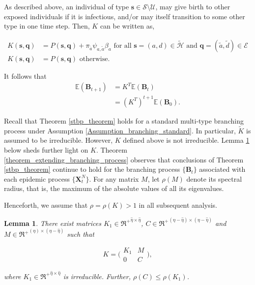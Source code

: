 \documentclass{article}
\newtheorem{lemma}{Lemma}[section]
\theoremstyle{definition}
\newcommand{\lrp}[1]{\left({#1}\right)}
\newcommand{\Exp}[1]{\mathbb{E}\lrp{#1}}
\begin{document}
 
    
As described above, an individual of type $\bm{s}\in \mathcal S \setminus \mathcal U$,  may give birth to other exposed individuals if it is infectious, and/or 
 may itself transition to some other type in one time step. Then, $K$ can be written as,

\begin {equation}
\begin{aligned}
K(\bm{s},\bm{q}) &= P(\bm{s},\bm{q}) + \pi_{\tilde{a}} \psi_{a, \tilde{a}} \beta_{a}  \text{ for all } \bm{s} = (a,d) \in \mathcal{\tilde{H}} \text{ and }
\bm{q} = (\tilde{a},\tilde{d}) \in\mathcal{E}
\\
 K(\bm{s},\bm{q}) &= P(\bm{s},\bm{q}) \text { otherwise.}  
\end{aligned}
\label{K_definition}
\end{equation}

 
It follows that
\begin{equation}
    \begin{aligned}
        \Exp{\bm{B}_{t+1}} &=  K^T \Exp{ \bm{B}_t }
        \\ & = (K^T)^{t+1} \Exp{ \bm{B}_0 }.
    \end{aligned}
    \label{branching_basic_eq}
\end{equation}
 
 
Recall that  Theorem \ref{stbp_theorem} holds for a standard multi-type branching process under Assumption \ref{Assumption_branching_standard}.  In particular, $\tilde{K}$ is assumed to be irreducible. 
  However, $K$  defined above is not irreducible. 
 Lemma \ref{matrix_structure} below sheds further light on $K$. 
  Theorem \ref{theorem_extending_branching_process} observes that conclusions of  Theorem \ref{stbp_theorem}
 continue to hold for the  branching process $\{{\bm{B}_t}\}$ associated with each epidemic process  $\{{\bm{X}_t^N}\}$.
 For any matrix $M$, let $\rho(M)$ denote its spectral radius, that is, the maximum of the absolute values of all its eigenvalues.
 
 Henceforth, we assume that $\rho =\rho(K) > 1$ in all subsequent analysis. 

 
\begin{lemma} 
 There exist matrices $K_1 \in {\Re^+}^{\hat\eta\times\hat\eta}$,  $C\in{\Re^+}^{(\eta-\hat\eta)\times(\eta-\hat\eta)} $ and $M \in {\Re^+}^{(\eta)\times(\eta-\hat\eta)}$ such that 

\[K=\big(\begin{smallmatrix} K_1 & M \\ 0 & C\end{smallmatrix}\big),\]

where $K_1 \in {\Re^+}^{\hat\eta\times\hat\eta}$  is  irreducible.
Further, $\rho(C)  \leq \rho(K_1)$. 
\label{matrix_structure}
\end{lemma}
\end{document}

